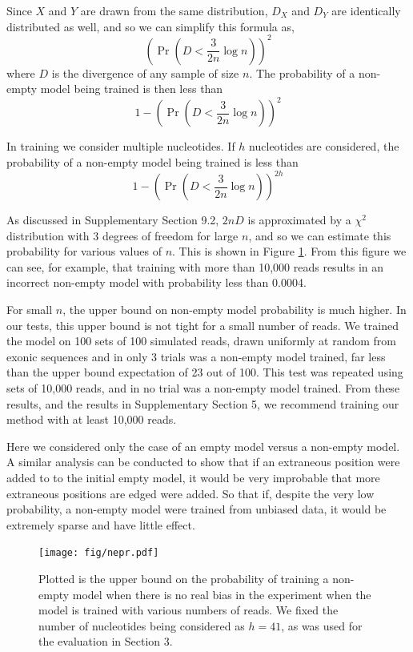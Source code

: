 \documentclass[letterpaper]{article}
\begin{document}
Since $X$ and $Y$ are drawn from the same distribution, $D_{X}$ and $D_{Y}$ are
identically distributed as well, and so we can simplify this formula as,
$$ (\Pr(D < \frac{3}{2n} \log n))^2 $$
where $D$ is the divergence of any sample of size $n$. The probability of a
non-empty model being trained is then less than
$$ 1 - (\Pr(D < \frac{3}{2n} \log n))^2 $$

In training we consider multiple nucleotides. If $h$ nucleotides are considered,
the probability of a non-empty model being trained is less than
$$ 1 - (\Pr(D < \frac{3}{2n} \log n))^{2h} $$

As discussed in Supplementary Section 9.2, $2n D$ is approximated by a $\chi^2$
distribution with 3 degrees of freedom for large $n$, and so we can estimate
this probability for various values of $n$. This is shown in Figure
\ref{fig:nepr}. From this figure we can see, for example, that training with
more than 10,000 reads results in an incorrect non-empty model with probability
less than 0.0004.

For small $n$, the upper bound on non-empty model probability is much higher.
In our tests, this upper bound is not tight for a small number of reads. We
trained the model on 100 sets of 100 simulated reads, drawn uniformly at random
from exonic sequences and in only 3 trials was a non-empty model trained, far
less than the upper bound expectation of 23 out of 100. This test was repeated
using sets of 10,000 reads, and in no trial was a non-empty model trained.  From
these results, and the results in Supplementary Section 5, we recommend training
our method with at least 10,000 reads.

Here we considered only the case of an empty model versus a non-empty model. A
similar analysis can be conducted to show that if an extraneous position were
added to to the initial empty model, it would be very improbable that more
extraneous positions are edged were added. So that if, despite the very low
probability, a non-empty model were trained from unbiased data, it would be
extremely sparse and have little effect.



\begin{figure}[H]
\centerline{
\texttt{[image: fig/nepr.pdf]}}
\caption{Plotted is the upper bound on the probability of training a non-empty
model when there is no real bias in the experiment when the model is trained
with various numbers of reads. We fixed the number of nucleotides being
considered as $h = 41$, as was used for the evaluation in Section 3.}
\label{fig:nepr}
\end{figure}



\end{document}
